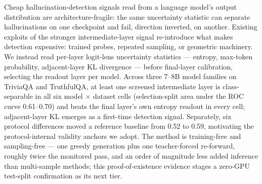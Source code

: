 Cheap hallucination-detection signals read from a language model's output distribution are architecture-fragile: the same uncertainty statistic can separate hallucinations on one checkpoint and fail, direction inverted, on another. Existing exploits of the stronger intermediate-layer signal re-introduce what makes detection expensive: trained probes, repeated sampling, or geometric machinery. We instead read per-layer logit-lens uncertainty statistics --- entropy, max-token probability, adjacent-layer KL divergence --- before final-layer calibration, selecting the readout layer per model. Across three 7--8B model families on TriviaQA and TruthfulQA, at least one screened intermediate layer is class-separable in all six model $\times$ dataset cells (selection-split area under the ROC curve 0.61--0.70) and beats the final layer's own entropy readout in every cell; adjacent-layer KL emerges as a first-time detection signal. Separately, six protocol differences moved a reference baseline from 0.52 to 0.59, motivating the protocol-internal validity anchors we adopt. The method is training-free and sampling-free --- one greedy generation plus one teacher-forced re-forward, roughly twice the monitored pass, and an order of magnitude less added inference than multi-sample methods; this proof-of-existence evidence stages a zero-GPU test-split confirmation as its next tier.
